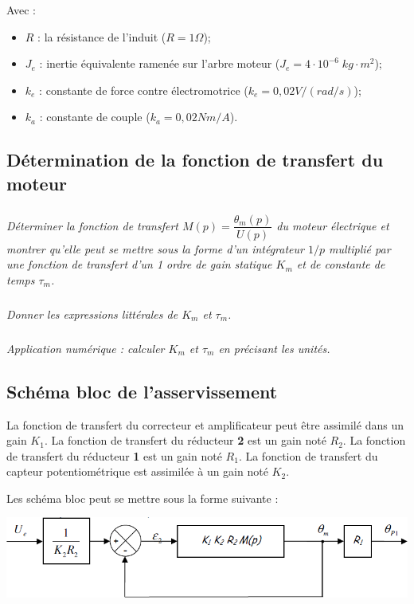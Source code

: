 \documentclass[10pt,fleqn]{article} %
\begin{document}
\begin{multicols}{2}
Avec :
\begin{itemize}
\item $R$ : la résistance de l'induit  ($R=1\Omega$);
\item $J_e$ : inertie équivalente ramenée sur l’arbre moteur ($J_e=4\cdot10^{-6} \;  kg\cdot m^2$);
\item $k_e$ : constante de force contre électromotrice ($k_e=0,02V/(rad/s)$);
\item $k_a$ : constante de couple ($k_a=0,02 Nm/A$).
\end{itemize}

\subsection*{Détermination de la fonction de transfert du moteur}
\subparagraph{}
\textit{Déterminer la fonction de transfert $M(p)=\dfrac{\theta_m(p)}{U(p)}$ du moteur électrique et montrer qu'elle peut se mettre sous la forme d'un intégrateur $1/p$ multiplié par une fonction de transfert d'un 1 ordre de gain statique $K_m$ et de constante de temps $\tau_m$.}

\subparagraph{}
\textit{Donner les expressions littérales de $K_m$ et $\tau_m$.}

\subparagraph{}
\textit{Application numérique : calculer $K_m$ et $\tau_m$ en précisant les unités.}


\subsection*{Schéma bloc de l'asservissement}
La fonction de transfert du correcteur et amplificateur peut être assimilé dans un gain $K_1$. La fonction de transfert du réducteur \textbf{2} est un gain noté $R_2$. La fonction de transfert du réducteur \textbf{1} est un gain noté $R_1$. La fonction de transfert du capteur potentiométrique est assimilée à un gain noté $K_2$.

 Les schéma bloc peut se mettre sous la forme suivante :
\begin{center}
\includegraphics[width=\linewidth]{images/image2_4}
\end{center}


\end{multicols}
\end{document}

